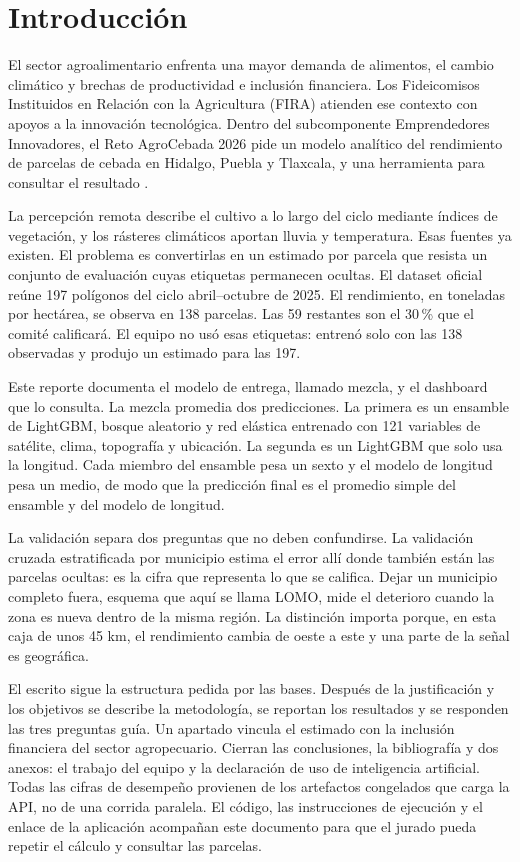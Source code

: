 \section{Introducción}

El sector agroalimentario enfrenta una mayor demanda de alimentos, el cambio climático y brechas de productividad e inclusión financiera. Los Fideicomisos Instituidos en Relación con la Agricultura (FIRA) atienden ese contexto con apoyos a la innovación tecnológica. Dentro del subcomponente Emprendedores Innovadores, el Reto AgroCebada 2026 pide un modelo analítico del rendimiento de parcelas de cebada en Hidalgo, Puebla y Tlaxcala, y una herramienta para consultar el resultado \citep{fira2026}.

La percepción remota describe el cultivo a lo largo del ciclo mediante índices de vegetación, y los rásteres climáticos aportan lluvia y temperatura. Esas fuentes ya existen. El problema es convertirlas en un estimado por parcela que resista un conjunto de evaluación cuyas etiquetas permanecen ocultas. El dataset oficial reúne 197 polígonos del ciclo abril–octubre de 2025. El rendimiento, en toneladas por hectárea, se observa en 138 parcelas. Las 59 restantes son el 30\,\% que el comité calificará. El equipo no usó esas etiquetas: entrenó solo con las 138 observadas y produjo un estimado para las 197.

Este reporte documenta el modelo de entrega, llamado mezcla, y el dashboard que lo consulta. La mezcla promedia dos predicciones. La primera es un ensamble de LightGBM, bosque aleatorio y red elástica \citep{ke2017,breiman2001,zou2005} entrenado con 121 variables de satélite, clima, topografía y ubicación. La segunda es un LightGBM que solo usa la longitud. Cada miembro del ensamble pesa un sexto y el modelo de longitud pesa un medio, de modo que la predicción final es el promedio simple del ensamble y del modelo de longitud.

La validación separa dos preguntas que no deben confundirse. La validación cruzada estratificada por municipio estima el error allí donde también están las parcelas ocultas: es la cifra que representa lo que se califica. Dejar un municipio completo fuera, esquema que aquí se llama LOMO, mide el deterioro cuando la zona es nueva dentro de la misma región. La distinción importa porque, en esta caja de unos 45 km, el rendimiento cambia de oeste a este y una parte de la señal es geográfica.

El escrito sigue la estructura pedida por las bases. Después de la justificación y los objetivos se describe la metodología, se reportan los resultados y se responden las tres preguntas guía. Un apartado vincula el estimado con la inclusión financiera del sector agropecuario. Cierran las conclusiones, la bibliografía y dos anexos: el trabajo del equipo y la declaración de uso de inteligencia artificial. Todas las cifras de desempeño provienen de los artefactos congelados que carga la API, no de una corrida paralela. El código, las instrucciones de ejecución y el enlace de la aplicación acompañan este documento para que el jurado pueda repetir el cálculo y consultar las parcelas.

